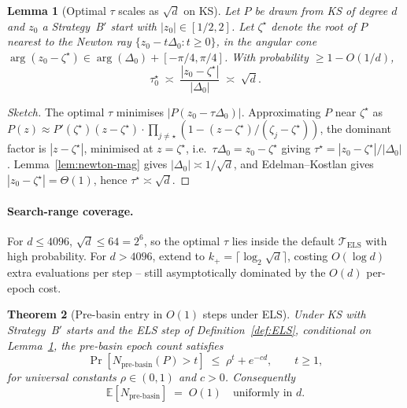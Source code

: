 \documentclass[11pt,a4paper]{article}
\newtheorem{theorem}{Theorem}[section]
\newtheorem{lemma}[theorem]{Lemma}
\begin{document}
\begin{lemma}[Optimal $\tau$ scales as $\sqrt d$ on KS]\label{lem:tau-typical}
Let $P$ be drawn from KS of degree $d$ and $z_0$ a Strategy~B$'$ start with $|z_0| \in [1/2, 2]$. Let $\zeta^\star$ denote the root of $P$ nearest to the Newton ray $\{z_0 - t \Delta_0 : t \ge 0\}$, in the angular cone $\arg(z_0 - \zeta^\star) \in \arg(\Delta_0) + [-\pi/4, \pi/4]$. With probability $\ge 1 - O(1/d)$,
\begin{equation}\label{eq:tau-scaling}
\tau^\star_0 \;\asymp\; \frac{|z_0 - \zeta^\star|}{|\Delta_0|} \;\asymp\; \sqrt d.
\end{equation}
\end{lemma}

\begin{proof}[Sketch]
The optimal $\tau$ minimises $|P(z_0 - \tau \Delta_0)|$. Approximating $P$ near $\zeta^\star$ as $P(z) \approx P'(\zeta^\star)(z - \zeta^\star)\cdot \prod_{j\ne\star}(1 - (z - \zeta^\star)/(\zeta_j - \zeta^\star))$, the dominant factor is $|z - \zeta^\star|$, minimised at $z = \zeta^\star$, i.e.\ $\tau \Delta_0 = z_0 - \zeta^\star$ giving $\tau^\star = |z_0 - \zeta^\star|/|\Delta_0|$. Lemma~\ref{lem:newton-mag} gives $|\Delta_0| \asymp 1/\sqrt d$, and Edelman--Kostlan gives $|z_0 - \zeta^\star| = \Theta(1)$, hence $\tau^\star \asymp \sqrt d$.
\end{proof}

\paragraph{Search-range coverage.} For $d \le 4096$, $\sqrt d \le 64 = 2^6$, so the optimal $\tau$ lies inside the default $\mathcal{T}_{\text{ELS}}$ with high probability. For $d > 4096$, extend to $k_+ = \lceil \log_2 \sqrt d \rceil$, costing $O(\log d)$ extra evaluations per step -- still asymptotically dominated by the $O(d)$ per-epoch cost.

\begin{theorem}[Pre-basin entry in $O(1)$ steps under ELS]\label{thm:O1}
Under KS with Strategy~B$'$ starts and the ELS step of Definition~\ref{def:ELS}, conditional on Lemma~\ref{lem:tau-typical}, the pre-basin epoch count satisfies
\begin{equation}\label{eq:O1-bound}
\Pr[N_{\text{pre-basin}}(P) > t] \;\le\; \rho^t + e^{-cd}, \qquad t \ge 1,
\end{equation}
for universal constants $\rho \in (0,1)$ and $c > 0$. Consequently
\begin{equation}\label{eq:E-O1}
\mathbb{E}[N_{\text{pre-basin}}] \;=\; O(1) \quad \text{uniformly in } d.
\end{equation}
\end{theorem}
\end{document}

